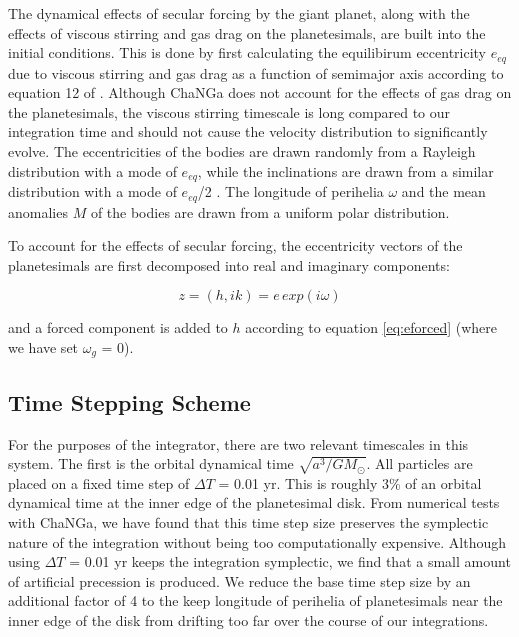 \documentclass[twocolumn]{aastex63}
\begin{document}
The dynamical effects of secular forcing by the giant planet, along with  the effects of viscous stirring and gas drag on the planetesimals, are 
built into the initial conditions. This is done by first calculating the equilibirum eccentricity $e_{eq}$ due to viscous stirring and gas drag as a 
function of semimajor axis according to equation 12 of \citet{2002ApJ...581..666K}. Although {\sc ChaNGa} does not account for the effects of 
gas drag on the planetesimals, the viscous stirring timescale is long compared to our integration time and should not cause the velocity 
distribution to significantly evolve. The eccentricities of the bodies are drawn randomly from a Rayleigh distribution with a mode of $e_{eq}$, 
while the inclinations are drawn from a similar distribution with a mode of $e_{eq}$/2 \citep{1993MNRAS.263..875I}. The longitude of perihelia 
$\omega$ and the mean anomalies $M$ of the bodies are drawn from a uniform polar distribution.

To account for the effects of secular forcing, the eccentricity vectors of the planetesimals are first decomposed into real and imaginary 
components:

\begin{equation}\label{eq:hk}
	z = (h, ik) = e \, exp(i \omega)
\end{equation}

\noindent and a forced component is added to $h$ according to equation \ref{eq:eforced} (where we have set $\omega_{g}$ = 0).

\subsection{Time Stepping Scheme}\label{sec:timestep}

For the purposes of the integrator, there are two relevant timescales in this system. The first is the orbital dynamical time $\sqrt{a^3/
G M_{\odot}}$. All particles are placed on a fixed time step of $\Delta T$ = 0.01 yr. This is roughly 3\% of an orbital dynamical time at 
the inner edge of the planetesimal disk. From numerical tests with {\sc ChaNGa}, we have found that this time step size preserves 
the symplectic nature of the integration without being too computationally expensive. Although using $\Delta T$ = 0.01 yr keeps the 
integration symplectic, we find that a small amount of artificial precession is produced. We reduce the base time step size by an additional 
factor of 4 to the keep longitude of perihelia of planetesimals near the inner edge of the disk from drifting too far over the course of our 
integrations.
\end{document}
